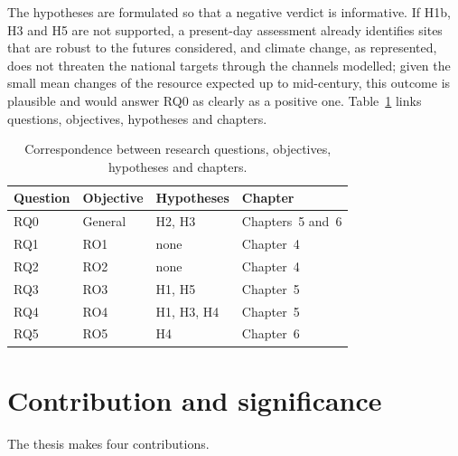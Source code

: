The hypotheses are formulated so that a negative verdict is informative. If H1b, H3 and H5 are not supported, a present-day assessment already identifies sites that are robust to the futures considered, and climate change, as represented, does not threaten the national targets through the channels modelled; given the small mean changes of the resource expected up to mid-century, this outcome is plausible and would answer RQ0 as clearly as a positive one. Table~\ref{tab:mapping} links questions, objectives, hypotheses and chapters.

\begin{table}[htbp]
\centering
\caption{Correspondence between research questions, objectives, hypotheses and chapters.}
\label{tab:mapping}
\small
\begin{tabular}{@{}lllp{}@{}}
\toprule
\textbf{Question} & \textbf{Objective} & \textbf{Hypotheses} & \textbf{Chapter} \\
\midrule
RQ0 & General & H2, H3 & Chapters~5 and~6 \\
RQ1 & RO1 & none & Chapter~4 \\
RQ2 & RO2 & none & Chapter~4 \\
RQ3 & RO3 & H1, H5 & Chapter~5 \\
RQ4 & RO4 & H1, H3, H4 & Chapter~5 \\
RQ5 & RO5 & H4 & Chapter~6 \\
\bottomrule
\end{tabular}
\end{table}

\section{Contribution and significance}
\label{sec:contribution}

The thesis makes four contributions.

